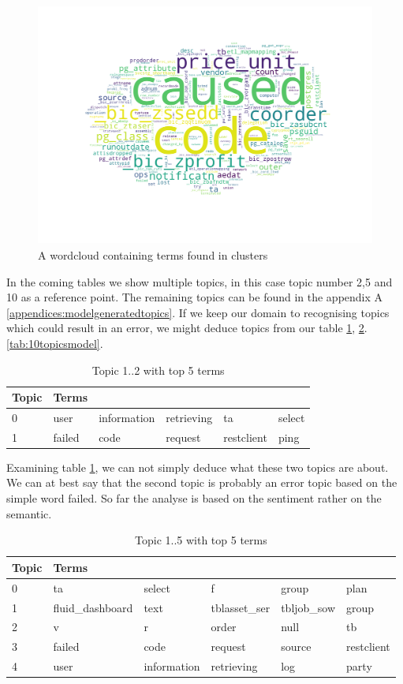  \begin{figure}[h]
    \centering
    \includegraphics[width=15cm, height=8cm]{figures/wc.png}
    \caption{A wordcloud containing terms found in clusters}
    \label{fig:worldcloud}
\end{figure}

In the coming tables we show multiple topics, in this case topic number 2,5 and 10 as a reference point. The remaining topics can be found in the appendix A \ref{appendices:modelgeneratedtopics}. If we keep our domain to recognising topics which could result in an error, we might deduce topics from our table \ref{tab:2topicsmodel}, \ref{tab:5topicsmodel}. \ref{tab:10topicsmodel}. 

\begin{table}[h]
\centering
\begin{tabular}{|l|l|l|l|l|l|}
 \hline
 Topic & Terms & & & & \\
 \hline
 \hline
 0 & user & information & retrieving & ta & select\\ 
 \hline 
 1 & failed & code & request & restclient & ping\\ 
 \hline 
\end{tabular}
\caption{Topic 1..2 with top 5 terms}
\label{tab:2topicsmodel}
\end{table}

Examining table \ref{tab:2topicsmodel}, we can not simply deduce what these two topics are about. We can at best say that the second topic is probably an error topic based on the simple word failed. So far the analyse is based on the sentiment rather on the semantic.


\begin{table}[h]
\centering
\begin{tabular}{|l|l|l|l|l|l|}
 \hline
 Topic & Terms & & & & \\
 \hline
 0 & ta & select & f & group & plan\\ 
 \hline 
 1 & fluid\_dashboard & text & tblasset\_ser & tbljob\_sow & group\\ 
 \hline 
 2 & v & r & order & null & tb\\ 
 \hline 
 3 & failed & code & request & source & restclient\\ 
 \hline 
 4 & user & information & retrieving & log & party\\ 
 \hline 
\end{tabular}
\caption{Topic 1..5 with top 5 terms}
\label{tab:5topicsmodel}
\end{table}

